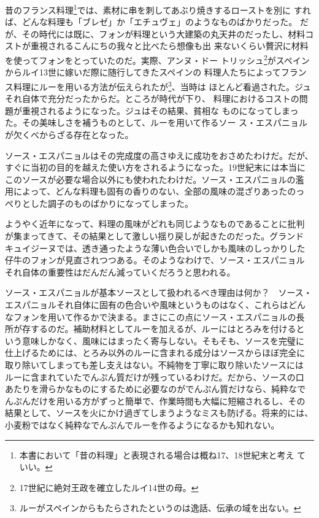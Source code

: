 \documentclass[twoside,12Q,b5j]{escoffierltjsbook}
\begin{document}
昔のフランス料理\footnote{本書において「昔の料理」と表現される場合は概ね17、18世紀末と考え
  ていい。}では、素材に串を刺してあぶり焼きするローストを別に
すれば、どんな料理も「ブレゼ」か「エチュヴェ」のようなものばかりだった。
だが、その時代には既に、フォンが料理という大建築の丸天井のだったし、材料コストが重視されるこんにちの我々と比べたら想像も出
来ないくらい贅沢に材料を使ってフォンをとっていたのだ。実際、アンヌ・ドー
トリッシュ\footnote{17世紀に絶対王政を確立したルイ14世の母。}がスペインからルイ13世に嫁いだ際に随行してきたスペインの
料理人たちによってフランス料理にルーを用いる方法が伝えられたが\footnote{ルーがスペインからもたらされたというのは逸話、伝承の域を出ない。}、当時は
ほとんど看過された。ジュそれ自体で充分だったからだ。ところが時代が下り、
料理におけるコストの問題が重視されるようになった。ジュはその結果、貧相な
ものになってしまった。その美味しさを補うものとして、ルーを用いて作るソー
ス・エスパニョルが欠くべからざる存在となった。

ソース・エスパニョルはその完成度の高さゆえに成功をおさめたわけだ。だが、
すぐに当初の目的を越えた使い方をされるようになった。19世紀末には本当に
このソースが必要な場合以外にも使われたわけだ。ソース・エスパニョルの濫
用によって、どんな料理も固有の香りのない、全部の風味の混ざりあったのっ
ぺりとした調子のものばかりになってしまった。

ようやく近年になって、料理の風味がどれも同じようなものであることに批判
が集まってきて、その結果として激しい揺り戻しが起きたのだった。グランド
キュイジーヌでは、透き通ったような薄い色合いでしかも風味のしっかりした
仔牛のフォンが見直されつつある。そのようなわけで、ソース・エスパニョル
それ自体の重要性はだんだん減っていくだろうと思われる。

ソース・エスパニョルが基本ソースとして扱われるべき理由は何か？　ソース・
エスパニョルそれ自体に固有の色合いや風味というものはなく、これらはどん
なフォンを用いて作るかで決まる。まさにこの点にソース・エスパニョルの長
所が存するのだ。補助材料としてルーを加えるが、ルーにはとろみを付けると
いう意味しかなく、風味にはまったく寄与しない。そもそも、ソースを完璧に
仕上げるためには、とろみ以外のルーに含まれる成分はソースからほぼ完全に
取り除いてしまっても差し支えはない。不純物を丁寧に取り除いたソースには
ルーに含まれていたでんぷん質だけが残っているわけだ。だから、ソースの口
あたりを滑らかなものにするために必要なのがでんぷん質だけなら、純粋なで
んぷんだけを用いる方がずっと簡単で、作業時間も大幅に短縮されるし、その
結果として、ソースを火にかけ過ぎてしまうようなミスも防げる。将来的には、
小麦粉ではなく純粋なでんぷんでルーを作るようになるかも知れない。
\end{document}
